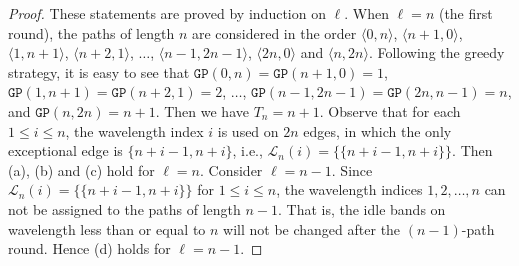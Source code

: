 \documentclass[journal,draftcls,onecolumn,12pt,twoside]{IEEEtran}
\newcommand{\GP}{{\mathtt{GP}}}
\begin{document}
\begin{proof}
These statements are proved by induction on $\ell$.
When $\ell=n$ (the first round), the paths of length $n$ are considered in the order $\langle 0,n\rangle$, $\langle n+1,0\rangle$, $\langle 1,n+1\rangle$, $\langle n+2,1\rangle$, $\ldots$, $\langle n-1,2n-1\rangle$, $\langle 2n,0\rangle$ and $\langle n,2n\rangle$.
Following the greedy strategy, it is easy to see that $\GP(0,n)=\GP(n+1,0)=1$, $\GP(1,n+1)=\GP(n+2,1)=2$, $\ldots$, $\GP(n-1,2n-1)=\GP(2n,n-1)=n$,  and $\GP(n,2n)=n+1$.
Then we have $T_n=n+1$.
Observe that for each $1\leq i\leq n$, the wavelength index $i$ is used on $2n$ edges, in which the only exceptional edge is $\{n+i-1,n+i\}$, i.e., $\mathcal{L}_{n}(i)=\{\{n+i-1,n+i\}\}$.
Then (a), (b) and (c) hold for $\ell=n$.
Consider $\ell=n-1$.
Since $\mathcal{L}_n(i)=\{\{n+i-1,n+i\}\}$ for $1\leq i\leq n$, the wavelength indices $1,2,\ldots,n$ can not be assigned to the paths of length $n-1$.
That is, the idle bands on wavelength less than or equal to $n$ will not be changed after the $(n-1)$-path round.
Hence (d) holds for $\ell=n-1$.


\end{proof}
\end{document}
